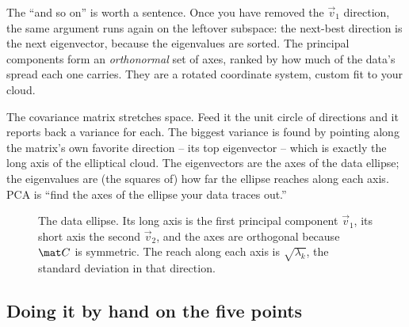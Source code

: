 The ``and so on'' is worth a sentence. Once you have removed the $\vec v_1$
direction, the same argument runs again on the leftover subspace: the next-best
direction is the next eigenvector, because the eigenvalues are sorted. The
principal components form an \emph{orthonormal} set of axes, ranked by how much of
the data's spread each one carries. They are a rotated coordinate system, custom
fit to your cloud.

\begin{intuitionbox}
The covariance matrix stretches space. Feed it the unit circle of directions and it
reports back a variance for each. The biggest variance is found by pointing along
the matrix's own favorite direction -- its top eigenvector -- which is exactly the
long axis of the elliptical cloud. The eigenvectors are the axes of the data
ellipse; the eigenvalues are (the squares of) how far the ellipse reaches along
each axis. PCA is ``find the axes of the ellipse your data traces out.''
\end{intuitionbox}

\begin{figure}[H]
\centering
{}
\caption{The data ellipse. Its long axis is the first principal component $\vec
v_1$, its short axis the second $\vec v_2$, and the axes are orthogonal because
$\mat C$ is symmetric. The reach along each axis is $\sqrt{\lambda_k}$, the
standard deviation in that direction.}
\label{ch30:ellipse}
\end{figure}

\subsection{Doing it by hand on the five points}

